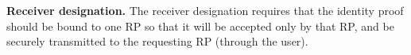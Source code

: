 \vspace{1mm}\noindent\textbf{Receiver  designation.} The receiver  designation requires that the identity proof should be bound to one RP so that it will be accepted only by that RP, and be securely transmitted to the requesting RP (through the user). 

